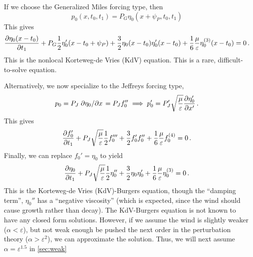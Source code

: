 \documentclass{jfm}
\renewcommand*{\epsilon}{\varepsilon}
\begin{document}
If we choose the Generalized Miles forcing type, then
\[
  p_0(x,t_0,t_1) = P_G \eta_0(x+\psi_P,t_0,t_1)
\]
This gives
\begin{equation}
  \pdv{\eta_0(x-t_0)}{t_1} + P_G \frac{1}{2} \eta_0'(x-t_0+\psi_P) +
  \frac{3}{2} \eta_0(x-t_0) \eta_0'(x-t_0) + \frac{1}{6}
  \frac{\mu}{\epsilon} \eta_0^{(3)}(x-t_0) = 0 \,.
  \label{eq:kdv_burgers_gen}
\end{equation}
This is the nonlocal Korteweg-de Vries (KdV) equation.
This is a rare, difficult-to-solve equation.

Alternatively, we now specialize to the Jeffreys forcing type,
\begin{equation}
  p_0 = P_J \pdv*{\eta_0}{x} = P_J f_0''
  \implies p'_0 = P'_J \sqrt{\frac{\mu}{\epsilon}} \pdv{\eta'_0}{x'}
  \,.
\end{equation}
This gives
\begin{equation}
   \pdv{f_0'}{t_1} + P_J \sqrt{\frac{\mu}{\epsilon}} \frac{1}{2} f_0'''
   + \frac{3}{2} f_0' f_0'' + \frac{1}{6} \frac{\mu}{\epsilon} f_0^{(4)}
   = 0 \,.
\end{equation}
Finally, we can replace $f_0' = \eta_0$ to yield
\begin{equation}
   \pdv{\eta_0}{t_1} + P_J \sqrt{\frac{\mu}{\epsilon}} \frac{1}{2}
   \eta_0'' + \frac{3}{2} \eta_0 \eta_0' + \frac{1}{6}
   \frac{\mu}{\epsilon} \eta_0^{(3)} = 0 \,.
  \label{eq:kdv_burgers}
\end{equation}
This is the Korteweg-de Vries (KdV)-Burgers equation, though the
``damping term'', $\eta_0''$ has a ``negative viscosity'' (which is
expected, since the wind should cause growth rather than decay).
The KdV-Burgers equation is not known to have any closed form solutions.
However, if we assume the wind is slightly weaker ($\alpha < \epsilon$),
but not weak enough be pushed the next order in the perturbation theory
($\alpha > \epsilon^2$), we can approximate the solution.
Thus, we will next assume $\alpha = \epsilon^{1.5}$ in \cref{sec:weak}
\end{document}
